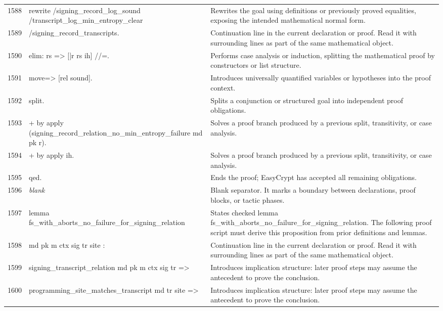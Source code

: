 \documentclass[10pt]{article}
\begin{document}
\begin{longtable}{r L{0.53\textwidth} L{0.37\textwidth}}
1588 & {\ttfamily\scriptsize rewrite /signing\_record\_log\_sound /transcript\_log\_min\_entropy\_clear} & Rewrites the goal using definitions or previously proved equalities, exposing the intended mathematical normal form. \\
1589 & {\ttfamily\scriptsize         /signing\_record\_transcripts.} & Continuation line in the current declaration or proof.  Read it with surrounding lines as part of the same mathematical object. \\
1590 & {\ttfamily\scriptsize elim: rs => [|r rs ih] //=.} & Performs case analysis or induction, splitting the mathematical proof by constructors or list structure. \\
1591 & {\ttfamily\scriptsize move=> [rel sound].} & Introduces universally quantified variables or hypotheses into the proof context. \\
1592 & {\ttfamily\scriptsize split.} & Splits a conjunction or structured goal into independent proof obligations. \\
1593 & {\ttfamily\scriptsize + by apply (signing\_record\_relation\_no\_min\_entropy\_failure md pk r).} & Solves a proof branch produced by a previous split, transitivity, or case analysis. \\
1594 & {\ttfamily\scriptsize + by apply ih.} & Solves a proof branch produced by a previous split, transitivity, or case analysis. \\
1595 & {\ttfamily\scriptsize qed.} & Ends the proof; EasyCrypt has accepted all remaining obligations. \\
1596 & {\ttfamily\scriptsize \emph{blank}} & Blank separator.  It marks a boundary between declarations, proof blocks, or tactic phases. \\
1597 & {\ttfamily\scriptsize lemma fs\_with\_aborts\_no\_failure\_for\_signing\_relation} & States checked lemma fs\_with\_aborts\_no\_failure\_for\_signing\_relation.  The following proof script must derive this proposition from prior definitions and lemmas. \\
1598 & {\ttfamily\scriptsize   md pk m ctx sig tr site :} & Continuation line in the current declaration or proof.  Read it with surrounding lines as part of the same mathematical object. \\
1599 & {\ttfamily\scriptsize   signing\_transcript\_relation md pk m ctx sig tr =>} & Introduces implication structure: later proof steps may assume the antecedent to prove the conclusion. \\
1600 & {\ttfamily\scriptsize   programming\_site\_matches\_transcript md tr site =>} & Introduces implication structure: later proof steps may assume the antecedent to prove the conclusion. \\

\end{longtable}
\end{document}
